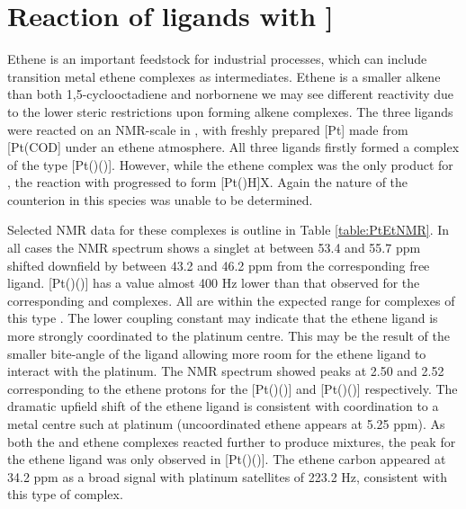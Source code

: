 \section{Reaction of \tBuxantphos{} ligands with \texorpdfstring{\ce{[Pt(C2H4)3}]} P}

Ethene is an important feedstock for industrial processes, which can include transition metal ethene complexes as intermediates.  Ethene is a smaller alkene than both 1,5-cyclooctadiene and norbornene we may see different reactivity due to the lower steric restrictions upon forming alkene complexes.  The three \tBuxantphos{} ligands were reacted on an NMR-scale in , with freshly prepared [Pt] made from [Pt(COD] under an ethene atmosphere.  All three ligands firstly formed a complex of the type [Pt(\tBuxantphos{})()].  However, while the ethene complex was the only product for \tButhixantphos, the reaction with \tBuxantphos{} progressed to form [Pt(\tBuxantphos)H]X.  Again the nature of the counterion in this species was unable to be determined.  

Selected NMR data for these complexes is outline in Table \ref{table:PtEtNMR}.  In all cases the \phosphorus{} NMR spectrum shows a singlet at between 53.4 and 55.7 ppm shifted downfield by between 43.2 and 46.2 ppm from the corresponding free ligand.  [Pt(\tBusixantphos{})()] has a \JPtP{} value almost 400 Hz lower than that observed for the corresponding \tButhixantphos{} and \tBuxantphos{} complexes.  All are within the expected range for complexes of this type .  The lower coupling constant may indicate that the ethene ligand is more strongly coordinated to the platinum centre.  This may be the result of the smaller bite-angle of the \tBusixantphos{} ligand allowing more room for the ethene ligand to interact with the platinum.  The \proton{} NMR spectrum showed peaks at 2.50 and 2.52 corresponding to the ethene protons for the [Pt(\tButhixantphos{})()] and [Pt(\tBuxantphos{})()] respectively.  The dramatic upfield shift of the ethene ligand is consistent with coordination to a metal centre such at platinum (uncoordinated ethene appears at 5.25 ppm\cite{Fulmer2010}).  As both the \tBusixantphos{} and \tBuxantphos{} ethene complexes reacted further to produce mixtures, the \carbon{} peak for the ethene ligand was only observed in [Pt(\tButhixantphos{})()].  The ethene carbon appeared at 34.2 ppm as a broad signal with platinum satellites of 223.2 Hz, consistent with this type of complex.  

